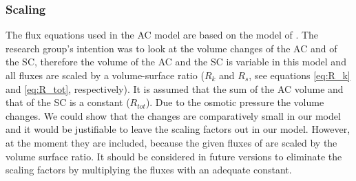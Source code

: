\subsubsection{Scaling}
The flux equations used in the AC model are based on the model of \citet{Ostby2009}. The research group's intention was to look at the volume changes of the AC and of the SC, therefore the volume of the AC and the SC is variable in this model and all fluxes are scaled by a volume-surface ratio ($R_k$ and $R_s$, see equations \ref{eq:R_k} and \ref{eq:R_tot}, respectively). It is assumed that the sum of the AC volume and that of the SC is a constant ($R_{tot}$). Due to the osmotic pressure the volume changes. We could show that the changes are comparatively small in our model and it would be justifiable to leave the scaling factors out in our model. However, at the moment they are included, because the given fluxes of \citet{Ostby2009} are scaled by the volume surface ratio. It should be considered in future versions to eliminate the scaling factors by multiplying the fluxes with an adequate constant. 




